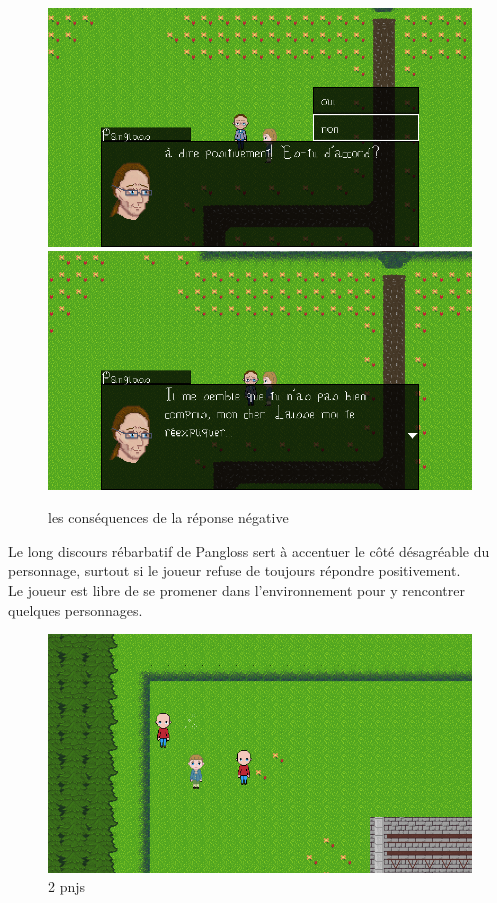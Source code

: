 \documentclass[11pt]{article}
\begin{document}
\begin{figure}[H]
\includegraphics[scale=0.35]{choix}
\includegraphics[scale=0.35]{gameplay4}
\centering
\caption{les conséquences de la réponse négative}
\end{figure}

Le long discours rébarbatif de Pangloss sert à accentuer le côté désagréable du personnage, surtout si le joueur refuse de toujours répondre positivement. \\

Le joueur est libre de se promener dans l'environnement pour y rencontrer quelques personnages.

\begin{figure}[H]
\includegraphics[scale=0.35]{gameplay5}
\caption{2 pnjs}
\end{figure} 
\end{document}
